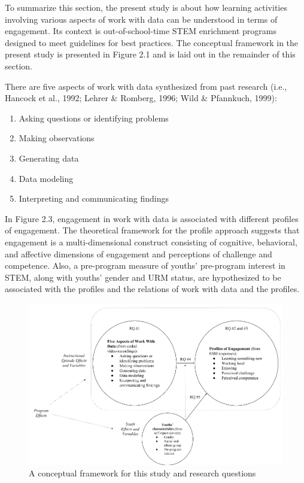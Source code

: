 \documentclass[]{msu-thesis}
\providecommand{\tightlist}{%
  \setlength{\itemsep}{0pt}\setlength{\parskip}{0pt}}
\theoremstyle{definition}
\theoremstyle{definition}
\theoremstyle{definition}
\theoremstyle{remark}
\begin{document}
To summarize this section, the present study is about how learning
activities involving various aspects of work with data can be understood
in terms of engagement. Its context is out-of-school-time STEM
enrichment programs designed to meet guidelines for best practices. The
conceptual framework in the present study is presented in Figure 2.1 and
is laid out in the remainder of this section.

There are five aspects of work with data synthesized from past research
(i.e., Hancock et al., 1992; Lehrer \& Romberg, 1996; Wild \& Pfannkuch,
1999):

\begin{enumerate}
\def\labelenumi{\arabic{enumi}.}
\tightlist
\item
  Asking questions or identifying problems
\item
  Making observations
\item
  Generating data
\item
  Data modeling
\item
  Interpreting and communicating findings
\end{enumerate}

In Figure 2.3, engagement in work with data is associated with different
profiles of engagement. The theoretical framework for the profile
approach suggests that engagement is a multi-dimensional construct
consisting of cognitive, behavioral, and affective dimensions of
engagement and perceptions of challenge and competence. Also, a
pre-program measure of youths' pre-program interest in STEM, along with
youths' gender and URM status, are hypothesized to be associated with
the profiles and the relations of work with data and the profiles.

\begin{figure}

{\centering \includegraphics[width=0.8\linewidth]{images/figure2}

}

\caption{A conceptual framework for this study and research questions}\label{fig:unnamed-chunk-1}
\end{figure}
\end{document}

